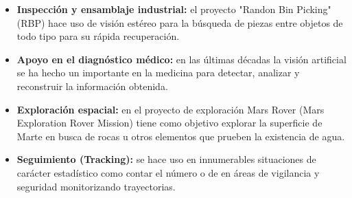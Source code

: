 \begin{itemize}
  \item \textbf{Inspección y ensamblaje industrial:} el proyecto "Randon Bin
  Picking" (RBP) hace uso de visión estéreo para la búsqueda de piezas entre
  objetos de todo tipo para su rápida recuperación.
  \item \textbf{Apoyo en el diagnóstico médico:} en las últimas décadas la
  visión artificial se ha hecho un importante en la medicina para detectar,
  analizar y reconstruir la información obtenida.
  \item \textbf{Exploración espacial:} en el proyecto de exploración Mars Rover
  (Mars Exploration Rover Mission) tiene como objetivo explorar la superficie
  de Marte en busca de rocas u otros elementos que prueben la existencia de
  agua.
  \item \textbf{Seguimiento (Tracking):} se hace uso en innumerables
  situaciones de carácter estadístico como contar el número o de en áreas de
  vigilancia y seguridad monitorizando trayectorias.
\end{itemize}

